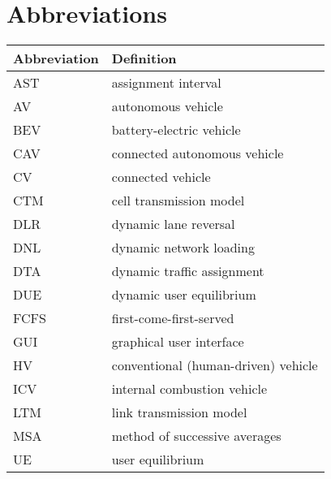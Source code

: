 \chapter{Abbreviations}

\begin{longtable}{ll}
\hline
Abbreviation & Definition\\\hline
\endhead
AST & assignment interval\\
AV & autonomous vehicle\\
BEV & battery-electric vehicle\\
CAV & connected autonomous vehicle\\
CV & connected vehicle \\
CTM &  cell transmission model~\cite{daganzo1994cell, daganzo1995cell}\\
DLR & dynamic lane reversal~\cite{levin2016cell, duell2016system} \\
DNL & dynamic network loading~\cite{chiu2011dynamic} \\
DTA & dynamic traffic assignment~\cite{chiu2011dynamic} \\
DUE & dynamic user equilibrium~\cite{wardrop1952road, chiu2011dynamic} \\
FCFS & first-come-first-served~\cite{fajardo2011automated}\\
GUI & graphical user interface\\
HV & conventional (human-driven) vehicle\\
ICV & internal combustion vehicle\cite{levin2014effect}\\
LTM & link transmission model~\cite{yperman2005link, yperman2007link}\\
MSA & method of successive averages\cite{levin2014improving}\\
UE & user equilibrium~\cite{wardrop1952road}\\
\hline
\end{longtable}